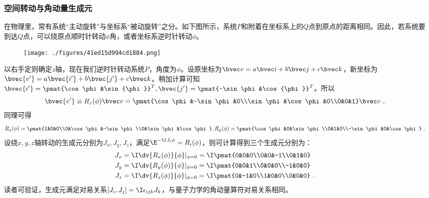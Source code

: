 
\begin{issues}
\issueMissDepend
\issueTODO
\end{issues}

\subsubsection{空间转动与角动量生成元}
在物理里，常有系统“主动旋转”与坐标系“被动旋转”之分。如下图所示，系统$P$和附着在坐标系上的$Q$点到原点的距离相同。因此，若系统要到达$Q$点，可以绕原点顺时针转动$\phi$角，或者坐标系逆时针转动$\phi$。
\begin{figure}[ht]
\centering
\texttt{[image: ./figures/41ed15d994cd1884.png]}
\caption{} \label{fig_spinqm_1}
\end{figure}
以右手定则确定$z$轴，现在我们逆时针转动系统$P$，角度为$\phi$。设原坐标为$\bvec v=a\bvec i+b\bvec j+c\bvec k$，新坐标为$\bvec {v'}=a\bvec {i'}+b\bvec {j'}+c\bvec k$。稍加计算可知$\bvec {i'}=\pmat{\cos \phi &\sin {\phi}}^T,\bvec {j'}=\pmat{-\sin \phi &\cos {\phi}}^T$。所以
\begin{equation}\label{eq_spinqm_2}
\bvec{v'}\equiv R_z(\phi)\bvec v=\pmat{\cos\phi&-\sin\phi&0\\\sin\phi&\cos \phi&0\\0&0&1}\bvec v~,
\end{equation}
同理可得
\begin{equation}
R_x(\phi)=\pmat {1&0&0\\0&\cos\phi&-\sin\phi\\0&\sin\phi&\cos\phi},R_y(\phi)=\pmat {\cos\phi&0&\sin\phi\\0&1&0\\-\sin\phi&0&\cos\phi}~.
\end{equation}
设绕$x,y,z$轴转动的生成元分别为$J_x,J_y,J_z$，满足$\E^{-\I J_i\phi}=R_i(\phi)$，则可计算得到三个生成元分别为：
\begin{equation}
\begin{aligned}
J_x&=\I \dv{R_x(\phi)}{\phi}|_{\phi=0}=\I \pmat{0&0&0\\0&0&-1\\0&1&0}\\
J_y&=\I \dv{R_y(\phi)}{\phi}|_{\phi=0}=\I\pmat{0&0&1\\0&0&0\\-1&0&0}\\
J_z&=\I \dv{R_z(\phi)}{\phi}|_{\phi=0}=\I\pmat{0&-1&0\\1&0&0\\0&0&0}~.
\end{aligned}
\end{equation}
读者可验证，生成元满足对易关系$[J_i,J_j]=\I\epsilon_{ijk}J_k$，与量子力学的角动量算符对易关系相同。



